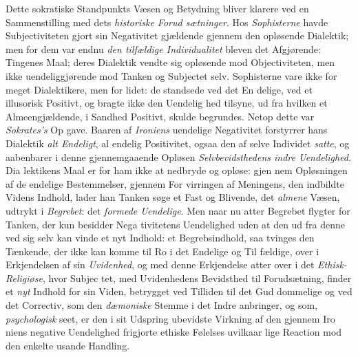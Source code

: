 Dette sokratiske Standpunkts Væsen og Betydning bliver
klarere ved en Sammenstilling med dets \emph{historiske Forud\-%
sætninger}. Hos \emph{Sophisterne} havde Subjectiviteten gjort
sin Negativitet gjældende gjennem den opløsende Dialektik;
men for dem var endnu \emph{den tilfældige Individualitet}
bleven det Afgjørende: Tingenes Maal; deres Dialektik vendte
sig opløsende mod Objectiviteten, men ikke uendeliggjørende
mod Tanken og Subjectet selv. Sophisterne vare ikke for
meget Dialektikere, men for lidet: de standsede ved det En\-%
delige, ved et illusorisk Positivt, og bragte ikke den Uendelig\-%
hed tilsyne, ud fra hvilken et Almeengjældende, i Sandhed
Positivt, skulde begrundes. Netop dette var \emph{Sokrates's} Op\-%
gave. Baaren af \emph{Ironiens} uendelige Negativitet forstyrrer hans
Dialektik \emph{alt Endeligt}, al endelig Positivitet, ogsaa den af
selve Individet \emph{satte}, og aabenbarer i denne gjennemgaaende
Opløsen \emph{Selvbevidsthedens indre Uendelighed}. Dia\-%
lektikens Maal er for ham ikke at nedbryde og opløse: gjen\-%
nem Opløsningen af de endelige Bestemmelser, gjennem For\-%
virringen af Meningens, den indbildte Videns Indhold, lader
han Tanken søge et Fast og Blivende, det \emph{almene} Væsen,
udtrykt i \emph{Begrebet}: det \emph{formede Uendelige}. Men naar
nu atter Begrebet flygter for Tanken, der kun besidder Nega\-%
tivitetens Uendelighed uden at den ud fra denne ved sig selv
kan vinde et nyt Indhold: et Begrebsindhold, saa tvinges den
Tænkende, der ikke kan komme til Ro i det Endelige og Til\-%
fældige, over i Erkjendelsen af sin \emph{Uvidenhed}, og med denne
Erkjendelse atter over i det \emph{Ethisk-Religiøse}, hvor Subjec\-%
tet, med Uvidenhedens Bevidsthed til Forudsætning, finder et
\emph{nyt} Indhold for sin Viden, betrygget ved Tilliden til det Gud\-%
dommelige og ved det Correctiv, som den \emph{dæmoniske}
Stemme i det Indre anbringer, og som, \emph{psychologisk} seet,
er den i sit Udspring ubevidste Virkning af den gjennem Iro\-%
niens negative Uendelighed frigjorte ethiske Følelses uvilkaar\-%
lige Reaction mod den enkelte usande Handling.

